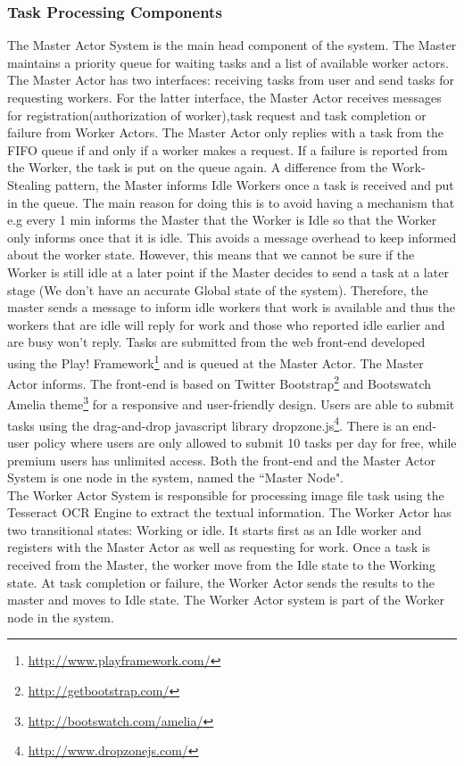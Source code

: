 \documentclass[conference]{IEEEtran}
\begin{document}
\subsubsection{Task Processing Components}\label{sec:sysdesign_task}
The Master Actor System is the main head component of the system. The Master maintains a priority queue for waiting tasks and a list of available worker actors. The Master Actor has two interfaces: receiving tasks from user and send tasks for requesting workers. For the latter interface, the Master Actor receives messages for registration(authorization of worker),task request and task completion or failure from Worker Actors. The Master Actor only replies with a task from the FIFO queue if and only if a worker makes a request. If a failure is reported from the Worker, the task is put on the queue again. A difference from the Work-Stealing pattern, the Master informs Idle Workers once a task is received and put in the queue. The main reason for doing this is to avoid having a mechanism that e.g every 1 min informs the Master that the Worker is Idle so that the Worker only informs once that it is idle. This avoids a message overhead to keep informed about the worker state. However, this means that we cannot be sure if the Worker is still idle at a later point if the Master decides to send a task at a later stage (We don't have an accurate Global state of the system). Therefore, the master sends a message to inform idle workers that work is available and thus the workers that are idle will reply for work and those who reported idle earlier and are busy won't reply. 
Tasks are submitted from the web front-end developed using the Play! Framework\footnote{\url{http://www.playframework.com/}}  and is queued at the Master Actor. The Master Actor informs. The front-end is based on Twitter Bootstrap\footnote{\url{http://getbootstrap.com/}} and Bootswatch Amelia theme\footnote{\url{http://bootswatch.com/amelia/}} for a responsive and user-friendly design. Users are able to submit tasks using the drag-and-drop javascript library dropzone.js\footnote{\url{http://www.dropzonejs.com/}}. There is an end-user policy where users are only allowed to submit 10 tasks per day for free, while premium users has unlimited access. Both the front-end and the Master Actor System is one node in the system, named the ``Master Node". \\
The Worker Actor System is responsible for processing image file task using the Tesseract OCR Engine to extract the textual information. The Worker Actor has two transitional states: Working or idle. It starts first as an Idle worker and registers with the Master Actor as well as requesting for work. Once a task is received from the Master, the worker move from the Idle state to the Working state. At task completion or failure, the Worker Actor sends the results to the master and moves to Idle state. The Worker Actor system is part of the Worker node in the system. \\
\end{document}
